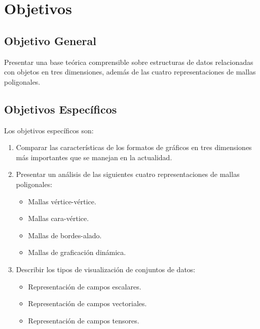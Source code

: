 \documentclass[letterpaper]{article}
\begin{document}
\section{Objetivos}

\subsection{Objetivo General}
Presentar una base te\' orica comprensible sobre estructuras de datos relacionadas con objetos en tres dimensiones, adem\' as de las cuatro representaciones de mallas poligonales.\\

\subsection{Objetivos Específicos}

Los objetivos específicos son:\\

\begin{enumerate}
\item Comparar las caracter\' isticas de los formatos de gr\' aficos en tres dimensiones m\' as importantes que se manejan en la actualidad.
\item Presentar un an\' alisis de las siguientes cuatro representaciones de mallas poligonales:
	\begin{itemize}
	\item Mallas v\' ertice-v\' ertice.
	\item Mallas cara-v\' ertice.
	\item Mallas de bordes-alado.
	\item Mallas de graficaci\' on din\' amica.
	\end{itemize}

%

\item Describir los tipos de visualizaci\' on de conjuntos de datos:
	\begin{itemize}
	\item Representaci\' on de campos escalares.
	\item Representaci\' on de campos vectoriales.
	\item Representaci\' on de campos tensores.
	\end{itemize}

\end{enumerate}
\end{document}
